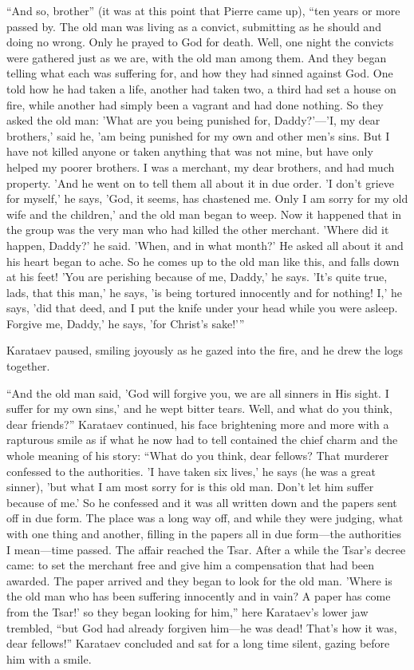 ``And so, brother'' (it was at this point that Pierre came up),
``ten years or more passed by. The old man was living as a
convict, submitting as he should and doing no wrong. Only he
prayed to God for death. Well, one night the convicts were
gathered just as we are, with the old man among them. And they
began telling what each was suffering for, and how they had
sinned against God. One told how he had taken a life, another had
taken two, a third had set a house on fire, while another had
simply been a vagrant and had done nothing. So they asked the old
man: 'What are you being punished for, Daddy?'---'I, my dear
brothers,' said he, 'am being punished for my own and other men's
sins. But I have not killed anyone or taken anything that was not
mine, but have only helped my poorer brothers. I was a merchant,
my dear brothers, and had much property. 'And he went on to tell
them all about it in due order. 'I don't grieve for myself,' he
says, 'God, it seems, has chastened me.  Only I am sorry for my
old wife and the children,' and the old man began to weep. Now it
happened that in the group was the very man who had killed the
other merchant. 'Where did it happen, Daddy?' he said. 'When, and
in what month?' He asked all about it and his heart began to
ache.  So he comes up to the old man like this, and falls down at
his feet!  'You are perishing because of me, Daddy,' he
says. 'It's quite true, lads, that this man,' he says, 'is being
tortured innocently and for nothing! I,' he says, 'did that deed,
and I put the knife under your head while you were
asleep. Forgive me, Daddy,' he says, 'for Christ's sake!'{}''

Karataev paused, smiling joyously as he gazed into the fire, and
he drew the logs together.

``And the old man said, 'God will forgive you, we are all sinners
in His sight. I suffer for my own sins,' and he wept bitter
tears. Well, and what do you think, dear friends?'' Karataev
continued, his face brightening more and more with a rapturous
smile as if what he now had to tell contained the chief charm and
the whole meaning of his story: ``What do you think, dear
fellows? That murderer confessed to the authorities. 'I have
taken six lives,' he says (he was a great sinner), 'but what I am
most sorry for is this old man. Don't let him suffer because of
me.' So he confessed and it was all written down and the papers
sent off in due form. The place was a long way off, and while
they were judging, what with one thing and another, filling in
the papers all in due form---the authorities I mean---time
passed. The affair reached the Tsar. After a while the Tsar's
decree came: to set the merchant free and give him a compensation
that had been awarded. The paper arrived and they began to look
for the old man. 'Where is the old man who has been suffering
innocently and in vain? A paper has come from the Tsar!' so they
began looking for him,'' here Karataev's lower jaw trembled,
``but God had already forgiven him---he was dead! That's how it
was, dear fellows!'' Karataev concluded and sat for a long time
silent, gazing before him with a smile.

